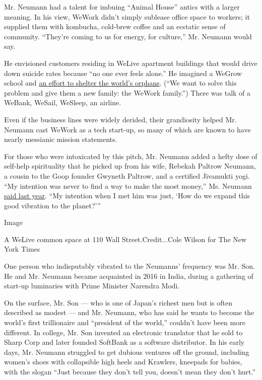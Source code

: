 Mr. Neumann had a talent for imbuing ``Animal House'' antics with a
larger meaning. In his view, WeWork didn't simply sublease office space
to workers; it supplied them with kombucha, cold-brew coffee and an
ecstatic sense of community. ``They're coming to us for energy, for
culture,'' Mr. Neumann would say.

He envisioned customers residing in WeLive apartment buildings that
would drive down suicide rates because ``no one ever feels alone.'' He
imagined a WeGrow school and
\href{http://nymag.com/intelligencer/2019/06/wework-adam-neumann.html}{an
effort to shelter the world's orphans}. (``We want to solve this problem
and give them a new family: the WeWork family.'') There was talk of a
WeBank, WeSail, WeSleep, an airline.

Even if the business lines were widely derided, their grandiosity helped
Mr. Neumann cast WeWork as a tech start-up, so many of which are known
to have nearly messianic mission statements.

For those who were intoxicated by this pitch, Mr. Neumann added a hefty
dose of self-help spirituality that he picked up from his wife, Rebekah
Paltrow Neumann, a cousin to the Goop founder Gwyneth Paltrow, and a
certified Jivamukti yogi. ``My intention was never to find a way to make
the most money,'' Ms. Neumann
\href{https://www.youtube.com/watch?v=nAQR-NVPX6o}{said last year}. ``My
intention when I met him was just, `How do we expand this good vibration
to the planet?'''

Image

A WeLive common space at 110 Wall Street.Credit...Cole Wilson for The
New York Times

One person who indisputably vibrated to the Neumanns' frequency was Mr.
Son. He and Mr. Neumann became acquainted in 2016 in India, during a
gathering of start-up luminaries with Prime Minister Narendra Modi.

On the surface, Mr. Son --- who is one of Japan's richest men but is
often described as modest --- and Mr. Neumann, who has said he wants to
become the world's first trillionaire and ``president of the world,''
couldn't have been more different. In college, Mr. Son invented an
electronic translator that he sold to Sharp Corp and later founded
SoftBank as a software distributor. In his early days, Mr. Neumann
struggled to get dubious ventures off the ground, including women's
shoes with collapsible high heels and Krawlers, kneepads for babies,
with the slogan ``Just because they don't tell you, doesn't mean they
don't hurt.''

